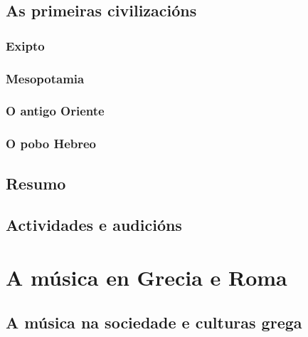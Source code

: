 \documentclass[a4paper, twoside]{templates/ociamthesis}
\begin{document}
\hypertarget{as-primeiras-civilizaciuxf3ns}{%
\section{As primeiras civilizacións}\label{as-primeiras-civilizaciuxf3ns}}

\hypertarget{exipto}{%
\subsection{Exipto}\label{exipto}}

\hypertarget{mesopotamia}{%
\subsection{Mesopotamia}\label{mesopotamia}}

\hypertarget{o-antigo-oriente}{%
\subsection{O antigo Oriente}\label{o-antigo-oriente}}

\hypertarget{o-pobo-hebreo}{%
\subsection{O pobo Hebreo}\label{o-pobo-hebreo}}

\hypertarget{resumo}{%
\section*{Resumo}\label{resumo}}

\hypertarget{actividades-e-audiciuxf3ns}{%
\section*{Actividades e audicións}\label{actividades-e-audiciuxf3ns}}

\hypertarget{a-muxfasica-en-grecia-e-roma}{%
\chapter{A música en Grecia e Roma}\label{a-muxfasica-en-grecia-e-roma}}

\minitoc 

\hypertarget{a-muxfasica-na-sociedade-e-culturas-grega}{%
\section{A música na sociedade e culturas grega}\label{a-muxfasica-na-sociedade-e-culturas-grega}}
\end{document}
